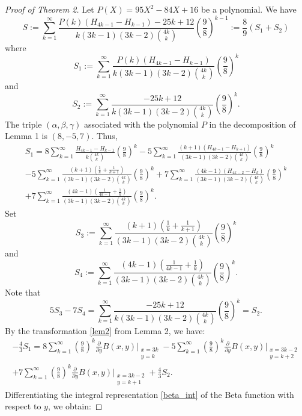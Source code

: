 \documentclass{amsart}
\numberwithin{equation}{section}
\begin{document}
\begin{proof}[Proof of Theorem 2]
    Let $P(X)=95X^2-84X+16$ be a polynomial. We have
    \begin{equation}
    S:=\sum_{k=1}^\infty  \frac{P(k)(H_{4k-1}-H_{k-1})-25k+12}{k(3k-1)(3k-2)\binom{4k}{k}}\left(\frac98\right)^{k-1}:=\frac89(S_1+S_2)
    \label{S}
    \end{equation}
    where
    \[S_1:=\sum_{k=1}^\infty  \frac{P(k)(H_{4k-1}-H_{k-1})}{k(3k-1)(3k-2)\binom{4k}{k}}\left(\frac98\right)^k\]
    and
    \[S_2:=\sum_{k=1}^\infty  \frac{-25k+12}{k(3k-1)(3k-2)\binom{4k}{k}}\left(\frac98\right)^k.\]
    The triple $(\alpha,\beta,\gamma)$ associated with the polynomial $P$ in the decomposition of Lemma 1 is $(8,-5,7)$. Thus,
    \begin{multline*}
        S_1=8\sum_{k=1}^\infty \frac{H_{4k-1}-H_{k-1}}{k\binom{4k}{k}}\left(\frac98\right)^k-5\sum_{k=1}^\infty\frac{(k+1)(H_{4k-1}-H_{k+1})}{(3k-1)(3k-2)\binom{4k}{k}}\left(\frac98\right)^k\\-5\sum_{k=1}^\infty\frac{(k+1)\left(\frac1k+\frac1{k+1}\right)}{(3k-1)(3k-2)\binom{4k}{k}}\left(\frac98\right)^k+7\sum_{k=1}^\infty\frac{(4k-1)(H_{4k-2}-H_{k})}{(3k-1)(3k-2)\binom{4k}{k}}\left(\frac98\right)^k\\+7\sum_{k=1}^\infty\frac{(4k-1)\left(\frac1{4k-1}+\frac1k\right)}{(3k-1)(3k-2)\binom{4k}{k}}\left(\frac98\right)^k.
    \end{multline*}
    Set
    \[S_3:=\sum_{k=1}^\infty\frac{(k+1)\left(\frac1k+\frac1{k+1}\right)}{(3k-1)(3k-2)\binom{4k}{k}}\left(\frac98\right)^k\]
    and
    \[S_4:=\sum_{k=1}^\infty\frac{(4k-1)\left(\frac1{4k-1}+\frac1k\right)}{(3k-1)(3k-2)\binom{4k}{k}}\left(\frac98\right)^k.\]
    Note that
    \[5S_3-7S_4=\sum_{k=1}^\infty \frac{-25k+12}{k(3k-1)(3k-2)\binom{4k}{k}}\left(\frac98\right)^k=S_2.\]
    By the transformation \eqref{lem2} from Lemma 2, we have:
    \begin{multline*}
        -\frac43S_1=8\sum_{k=1}^\infty \left(\frac98\right)^k\frac{\partial}{\partial y}B(x,y)\Bigg|_{\substack{x=3k\\y=k}}-5\sum_{k=1}^\infty\left(\frac98\right)^k\frac{\partial}{\partial y}B(x,y)\Bigg|_{\substack{x=3k-2\\y=k+2}}\\+7\sum_{k=1}^\infty\left(\frac98\right)^k \frac{\partial}{\partial y}B(x,y)\Bigg|_{\substack{x=3k-2\\y=k+1}}+\frac{4}{3}S_2.
    \end{multline*}
    Differentiating the integral representation \eqref{beta_int} of the Beta function with respect to $y$, we obtain:

\end{proof}
\end{document}
